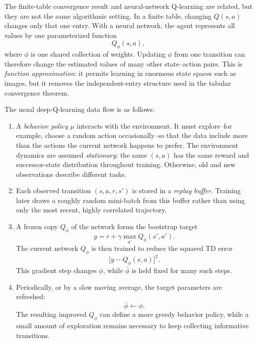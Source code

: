 \documentclass[11pt,a4paper]{article}
\theoremstyle{definition}
\begin{document}
\begin{note}
The finite-table convergence result and neural-network Q-learning are related, but they are not
the same algorithmic setting. In a finite table, changing $Q(s,a)$ changes only that one entry.
With a neural network, the agent represents all values by one parameterized function
\[
Q_\phi(s,a),
\]
where $\phi$ is one shared collection of weights. Updating $\phi$ from one transition can
therefore change the estimated values of many other state--action pairs. This is
\emph{function approximation}: it permits learning in enormous state spaces such as images,
but it removes the independent-entry structure used in the tabular convergence theorem.

The usual deep-Q-learning data flow is as follows:
\begin{enumerate}
    \item A \emph{behavior policy} $\mu$ interacts with the environment. It must explore--for
    example, choose a random action occasionally--so that the data include more than the actions
    the current network happens to prefer. The environment dynamics are assumed
    \emph{stationary}: the same $(s,a)$ has the same reward and successor-state distribution
    throughout training. Otherwise, old and new observations describe different tasks.

    \item Each observed transition $(s,a,r,s')$ is stored in a \emph{replay buffer}. Training
    later draws a roughly random mini-batch from this buffer rather than using only the most
    recent, highly correlated trajectory.

    \item A frozen copy $Q_{\bar\phi}$ of the network forms the bootstrap target
    \[
    y=r+\gamma\max_{a'}Q_{\bar\phi}(s',a').
    \]
    The current network $Q_\phi$ is then trained to reduce the squared TD error
    \[
    \bigl[y-Q_\phi(s,a)\bigr]^2.
    \]
    This gradient step changes $\phi$, while $\bar\phi$ is held fixed for many such steps.

    \item Periodically, or by a slow moving average, the target parameters are refreshed:
    \[
    \bar\phi\leftarrow\phi.
    \]
    The resulting improved $Q_\phi$ can define a more greedy behavior policy, while a small
    amount of exploration remains necessary to keep collecting informative transitions.
\end{enumerate}


\end{note}
\end{document}
